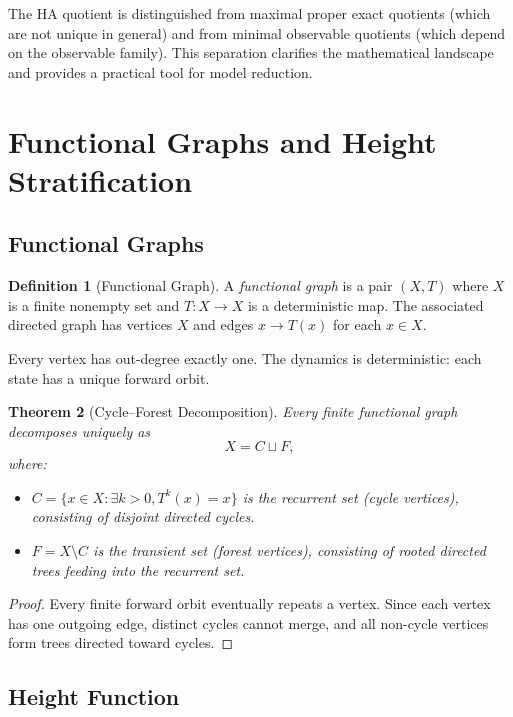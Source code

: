 \documentclass[11pt, a4paper]{article}
\newtheorem{theorem}{Theorem}[section]
\theoremstyle{definition}
\newtheorem{definition}[theorem]{Definition}
\theoremstyle{remark}
\begin{document}
The HA quotient is distinguished from maximal proper exact quotients (which are not unique in general) and from minimal observable quotients (which depend on the observable family). This separation clarifies the mathematical landscape and provides a practical tool for model reduction.

\section{Functional Graphs and Height Stratification}

\subsection{Functional Graphs}

\begin{definition}[Functional Graph]
A \emph{functional graph} is a pair \((X, T)\) where \(X\) is a finite nonempty set and \(T: X \to X\) is a deterministic map. The associated directed graph has vertices \(X\) and edges \(x \to T(x)\) for each \(x \in X\).
\end{definition}

Every vertex has out-degree exactly one. The dynamics is deterministic: each state has a unique forward orbit.

\begin{theorem}[Cycle–Forest Decomposition]
Every finite functional graph decomposes uniquely as
\[
X = C \sqcup F,
\]
where:
\begin{itemize}
\item \(C = \{x \in X : \exists k > 0, T^k(x) = x\}\) is the \emph{recurrent set} (cycle vertices), consisting of disjoint directed cycles.
\item \(F = X \setminus C\) is the \emph{transient set} (forest vertices), consisting of rooted directed trees feeding into the recurrent set.
\end{itemize}
\end{theorem}

\begin{proof}
Every finite forward orbit eventually repeats a vertex. Since each vertex has one outgoing edge, distinct cycles cannot merge, and all non-cycle vertices form trees directed toward cycles.
\end{proof}

\subsection{Height Function}
\end{document}
